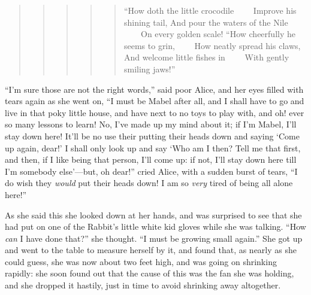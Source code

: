 \documentclass[11pt,openany,oneside]{book}
\begin{document}
\begin{quote}
\begin{quote}
\begin{quote}
\begin{quote}
\begin{quote}
{\small “How doth the little crocodile}\newline
{\small  ~~~~Improve his shining tail,}\newline
{\small  And pour the waters of the Nile}\newline
{\small  ~~~~On every golden scale!}\newline
{\small  }\newline
{\small  “How cheerfully he seems to grin,}\newline
{\small  ~~~~How neatly spread his claws,}\newline
{\small  And welcome little fishes in}\newline
{\small  ~~~~With gently smiling jaws!” }

\end{quote}
\end{quote}
\end{quote}
\end{quote}
\end{quote}
“I’m sure those are not the right words,” said poor Alice, and her eyes filled with tears again as she went on, “I must be Mabel after all, and I shall have to go and live in that poky little house, and have next to no toys to play with, and oh! ever so many lessons to learn! No, I’ve made up my mind about it; if I’m Mabel, I’ll stay down here! It’ll be no use their putting their heads down and saying ‘Come up again, dear!’ I shall only look up and say ‘Who am I then? Tell me that first, and then, if I like being that person, I’ll come up: if not, I’ll stay down here till I’m somebody else’—but, oh dear!” cried Alice, with a sudden burst of tears, “I do wish they {\em would\/} put their heads down! I am so {\em very\/} tired of being all alone here!” 

As she said this she looked down at her hands, and was surprised to see that she had put on one of the Rabbit’s little white kid gloves while she was talking. “How {\em can\/} I have done that?” she thought. “I must be growing small again.” She got up and went to the table to measure herself by it, and found that, as nearly as she could guess, she was now about two feet high, and was going on shrinking rapidly: she soon found out that the cause of this was the fan she was holding, and she dropped it hastily, just in time to avoid shrinking away altogether. 
\end{document}
